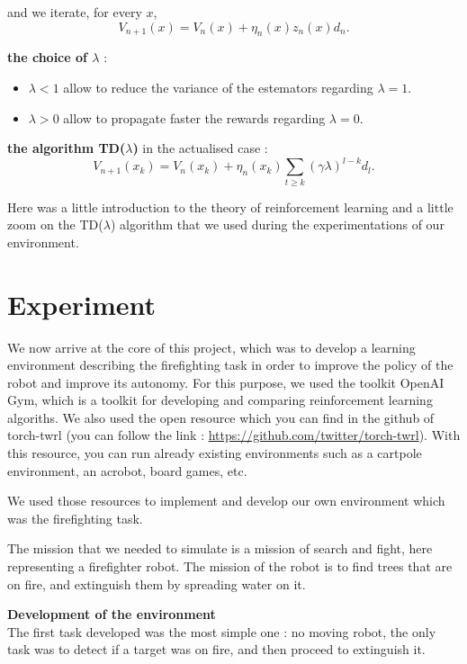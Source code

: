 \documentclass[conference]{IEEEtran}
\begin{document}
and we iterate, for every $x$, 
\begin{equation*}
V_{n+1}(x) = V_n(x) + \eta_n(x)z_n(x)d_n.
\end{equation*}

\textbf{the choice of $\lambda$} :
\begin{itemize}
 \item $\lambda < 1$ allow to reduce the variance of the estemators regarding $\lambda=1$.
 \item $\lambda > 0$ allow to propagate faster the rewards regarding $\lambda=0$.
\end{itemize}

\textbf{the algorithm TD($\lambda$)} in the actualised case :
\begin{equation*}
V_{n+1}(x_k)=V_n(x_k)+\eta_n(x_k)\sum_{t \geqslant k}(\gamma \lambda)^{l-k}d_l.
\end{equation*}

Here was a little introduction to the theory of reinforcement learning and a little zoom on the TD($\lambda$) algorithm that we used during the experimentations of our environment.

\section{Experiment}

We now arrive at the core of this project, which was to develop a learning environment describing the firefighting task in order to improve the policy of the robot and improve its autonomy. For this purpose, we used the toolkit OpenAI Gym, which is a toolkit for developing and comparing reinforcement learning algoriths. We also used the open resource which you can find in the github of torch-twrl (you can follow the link : \url{https://github.com/twitter/torch-twrl}). With this resource, you can run already existing environments such as a cartpole environment, an acrobot, board games, etc.


We used those resources to implement and develop our own environment which was the firefighting task.

The mission that we needed to simulate is a mission of search and fight, here representing a firefighter robot. The mission of the robot is to find trees that are on fire, and extinguish them by spreading water on it.

\textbf{Development of the environment}\\

The first task developed was the most simple one : no moving robot, the only task was to detect if a target was on fire, and then proceed to extinguish it.\\
\end{document}
